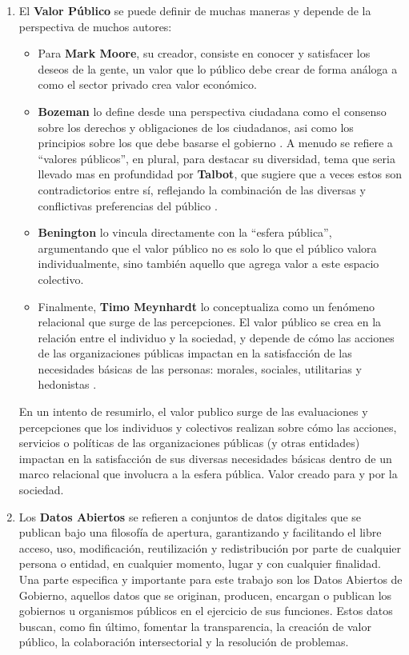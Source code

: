 \begin{enumerate}
	\item El \textbf{Valor Público} se puede definir de muchas maneras y depende de la perspectiva de muchos autores:
	\label{def3} 
	\begin{itemize}
		\item[\textbullet] Para \textbf{Mark Moore}, su creador, consiste en conocer y satisfacer los deseos de la gente, un valor que lo público debe crear de forma análoga a como el sector privado crea valor económico. \citep{moore1995creating}
		\item[\textbullet] \textbf{Bozeman} lo define desde una perspectiva ciudadana como el consenso sobre los derechos y obligaciones de los ciudadanos, asi como los principios sobre los que debe basarse el gobierno  \citep{bozeman2007public}. A menudo se refiere a ``valores públicos'', en plural, para destacar su diversidad, tema que seria llevado mas en profundidad por \textbf{Talbot}, que sugiere que a veces estos son contradictorios entre sí, reflejando la combinación de las diversas y conflictivas preferencias del público \citep{Talbot01012011}.
		\item[\textbullet] \textbf{Benington} lo vincula directamente con la ``esfera pública'', argumentando que el valor público no es solo lo que el público valora individualmente, sino también aquello que agrega valor a este espacio colectivo. \citep{Benington19032009}
		\item[\textbullet] Finalmente, \textbf{Timo Meynhardt} lo conceptualiza como un fenómeno relacional que surge de las percepciones. El valor público se crea en la relación entre el individuo y la sociedad, y depende de cómo las acciones de las organizaciones públicas impactan en la satisfacción de las necesidades básicas de las personas: morales, sociales, utilitarias y hedonistas  \citep{Meynhardt19032009}.
	\end{itemize}
	
	En un intento de resumirlo, el valor publico surge de las evaluaciones y percepciones que los individuos y colectivos realizan sobre cómo las acciones, servicios o políticas de las organizaciones públicas (y otras entidades) impactan en la satisfacción de sus diversas necesidades básicas dentro de un marco relacional que involucra a la esfera pública. Valor creado para y por la sociedad.


	\item Los \textbf{Datos Abiertos} \label{def4} se refieren a conjuntos de datos digitales que se publican bajo una filosofía de apertura, garantizando y facilitando el libre acceso, uso, modificación, reutilización y redistribución por parte de cualquier persona o entidad, en cualquier momento, lugar y con cualquier finalidad. Una parte especifica y importante para este trabajo son los Datos Abiertos de Gobierno, aquellos datos que se originan, producen, encargan o publican los gobiernos u organismos públicos en el ejercicio de sus funciones. Estos datos buscan, como fin último, fomentar la transparencia, la creación de valor público, la colaboración intersectorial y la resolución de problemas.
	

\end{enumerate}
